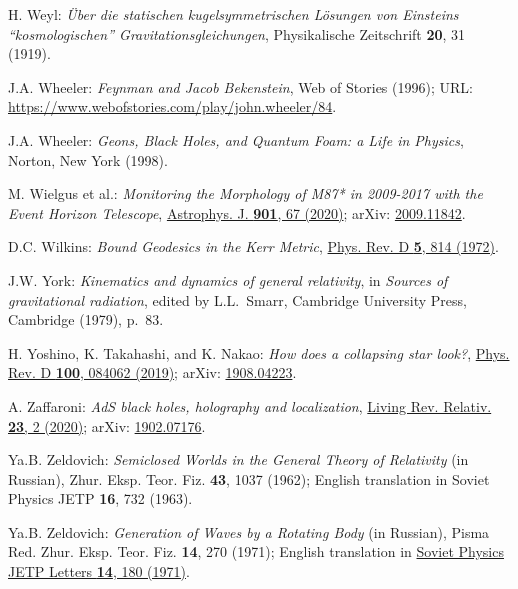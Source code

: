 \begin{thebibliography}{123}
H. Weyl:
{\em \"Uber die statischen kugelsymmetrischen L\"osungen von Einsteins ``kosmologischen'' Gravitationsgleichungen},
Physikalische Zeitschrift {\bf 20}, 31 (1919).

J.A. Wheeler:
{\em Feynman and Jacob Bekenstein},
Web of Stories (1996);
URL: \url{https://www.webofstories.com/play/john.wheeler/84}.

J.A. Wheeler:
{\em Geons, Black Holes, and Quantum Foam: a Life in Physics},
Norton, New York (1998).

M. Wielgus et al.:
{\em Monitoring the Morphology of M87* in 2009-2017 with the Event Horizon Telescope},
\href{https://doi.org/10.3847/1538-4357/abac0d}{Astrophys. J. {\bf 901}, 67 (2020)};
arXiv: \href{https://arxiv.org/abs/2009.11842}{2009.11842}.

D.C. Wilkins:
{\em Bound Geodesics in the Kerr Metric},
\href{https://doi.org/10.1103/PhysRevD.5.814}{Phys. Rev. D {\bf 5}, 814 (1972)}.

J.W. York:
{\em Kinematics and dynamics of general relativity},
in {\em Sources of gravitational radiation}, edited by L.L.~Smarr,
Cambridge University Press, Cambridge (1979), p.~83.

H. Yoshino, K. Takahashi, and K. Nakao:
{\em How does a collapsing star look?},
\href{https://doi-org.ezproxy.obspm.fr/10.1103/PhysRevD.100.084062}{Phys. Rev. D {\bf 100}, 084062 (2019)};
arXiv: \href{https://arxiv.org/abs/1908.04223}{1908.04223}.

A. Zaffaroni:
{\em AdS black holes, holography and localization},
\href{https://doi.org/10.1007/s41114-020-00027-8}{Living Rev. Relativ. {\bf 23}, 2 (2020)};
arXiv: \href{https://arxiv.org/abs/1902.07176}{1902.07176}.


Ya.B. Zeldovich:
{\em Semiclosed Worlds in the General Theory of Relativity} (in Russian),
Zhur. Eksp. Teor. Fiz. {\bf 43}, 1037 (1962); English translation in
Soviet Physics JETP {\bf 16}, 732 (1963).

Ya.B. Zeldovich:
{\em Generation of Waves by a Rotating Body} (in Russian),
Pisma Red. Zhur. Eksp. Teor. Fiz. {\bf 14}, 270 (1971); English translation in
\href{http://jetpletters.ru/ps/0/article_24607.shtml}{Soviet Physics JETP Letters {\bf 14}, 180 (1971)}.


\end{thebibliography}
